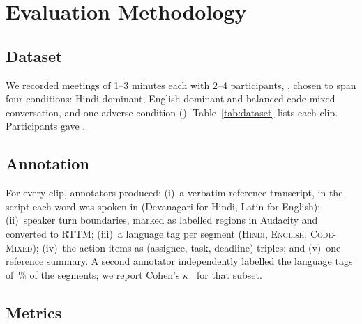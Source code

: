 \section{Evaluation Methodology}
\label{sec:evaluation}

\subsection{Dataset}
We recorded  meetings of 1--3 minutes each with 2--4 participants,
, chosen to span four conditions: Hindi-dominant,
English-dominant and balanced code-mixed conversation, and one adverse condition
(). Table~\ref{tab:dataset}
lists each clip. Participants gave . 

\begin{table}[t]
\centering
\caption{Evaluation clips.}
\label{tab:dataset}
\end{table}

\subsection{Annotation}
For every clip, annotators produced: (i)~a verbatim reference transcript, in
the script each word was spoken in (Devanagari for Hindi, Latin for English);
(ii)~speaker turn boundaries, marked as labelled regions in Audacity and
converted to RTTM; (iii)~a language tag per segment (\textsc{Hindi},
\textsc{English}, \textsc{Code-Mixed}); (iv)~the action items as (assignee,
task, deadline) triples; and (v)~one reference summary. A second annotator
independently labelled the language tags of \,\% of the segments;
we report Cohen's $\kappa$~\cite{cohen1960kappa} for that subset.

\subsection{Metrics}
